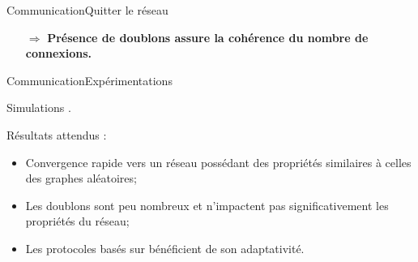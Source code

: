 \begin{frame}{Communication}{Quitter le réseau}
  \vspace{1cm}
  \large
  \begin{itemize}
  \item [$\Rightarrow$] \textbf{Présence de doublons assure la cohérence du
      nombre de connexions.}
  \end{itemize}
 
\end{frame}


\begin{frame}{Communication}{Expérimentations}

  Simulations \PEERSIM.




  
  \vspace{0.5cm}


  Résultats attendus :
  \begin{itemize}
  \item Convergence rapide vers un réseau possédant des propriétés similaires à
    celles des graphes aléatoires;
  \item Les doublons sont peu nombreux et n'impactent pas significativement les
    propriétés du réseau;
  \item Les protocoles basés sur \SPRAY bénéficient de son adaptativité.
  \end{itemize}

\end{frame}



